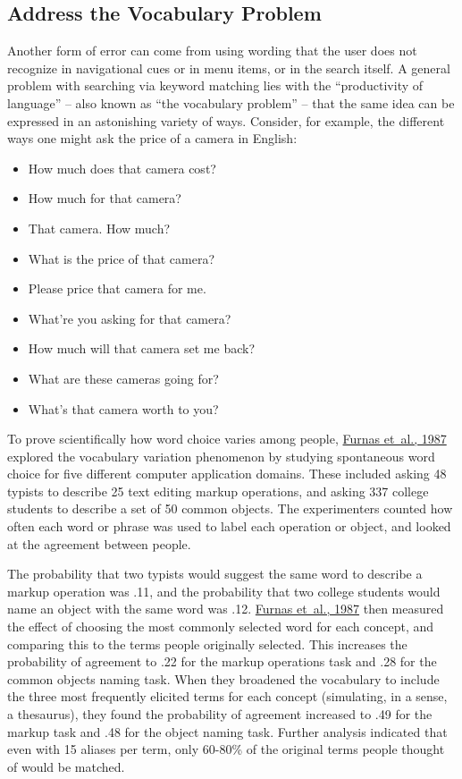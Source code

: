 \documentclass[sigconf,nonacm,screen,pbalance]{acmart}
\begin{document}
\subsection{Address the Vocabulary Problem}

Another form of error can come from using wording that the user does not recognize in navigational cues
or in menu items, or in the search itself. A general problem with searching via keyword matching lies
with the ``productivity of language'' -- also known as ``the vocabulary problem'' -- that the same idea can
be expressed in an astonishing variety of ways. Consider, for example, the different ways one might ask
the price of a camera in English:

\begin{itemize}
\item How much does that camera cost? 
\item How much for that camera? 
\item That camera. How much? 
\item What is the price of that camera? 
\item Please price that camera for me. 
\item What're you asking for that camera? 
\item How much will that camera set me back? 
\item What are these cameras going for? 
\item What's that camera worth to you? 
\end{itemize}

To prove scientifically how word choice varies among people, \href{https://searchuserinterfaces.com/book/sui_references.html#furnas1987vph}{Furnas et~al., 1987} explored the
vocabulary variation phenomenon by studying spontaneous word choice for five different computer
application domains. These included asking 48 typists to describe 25 text editing markup operations, and
asking 337 college students to describe a set of 50 common objects. The experimenters counted how often
each word or phrase was used to label each operation or object, and looked at the agreement between
people.

The probability that two typists would suggest the same word to describe a markup operation was .11, and
the probability that two college students would name an object with the same word was .12. \href{https://searchuserinterfaces.com/book/sui_references.html#furnas1987vph}{Furnas et~al., 1987} then measured the
effect of choosing the most commonly selected word for each concept, and comparing this to the terms
people originally selected. This increases the probability of agreement to .22 for the markup operations
task and .28 for the common objects naming task. When they broadened the vocabulary to include the three
most frequently elicited terms for each concept (simulating, in a sense, a thesaurus), they found the
probability of agreement increased to .49 for the markup task and .48 for the object naming task.
Further analysis indicated that even with 15 aliases per term, only 60-80\% of the original terms people
thought of would be matched.
\end{document}
